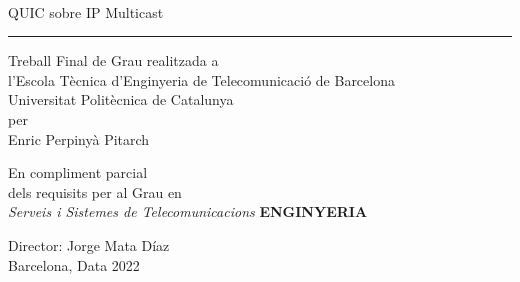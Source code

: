 {
        \fancyhf{}\renewcommand{\headrulewidth}{0pt}
    }

    \thispagestyle{empty}
    \begin{center}
    {\sffamily 
    \\
    \vspace{1cm}
    {\Huge QUIC sobre IP Multicast}\\
    \vspace{0.5cm}
    {\color{black}\hrule height 1pt}
    \vspace{1cm}
    {
        \large{Treball Final de Grau realitzada a\\
            l'Escola T\`ecnica d'Enginyeria de Telecomunicaci\'o de Barcelona \\
            Universitat Polit\`ecnica de Catalunya \\
            per\\
            \vspace{0.5cm} {\Huge{Enric Perpinyà Pitarch}}
        }
    }

    \vspace{1.5cm}

    {En compliment parcial\\
    dels requisits per al Grau en \\
    \textit{Serveis i Sistemes de Telecomunicacions} \textbf{ENGINYERIA}}

    \vspace{2cm}

    {Director: Jorge Mata Díaz\\}
    {Barcelona, Data 2022}

    \vspace{2cm}

    \thispagestyle{alim}
}

\end{center}

